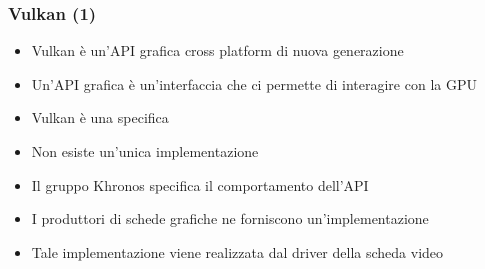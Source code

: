 \begin{frame}
\frametitle{Vulkan (1)}

\begin{itemize}
\item Vulkan è un'API grafica cross platform di nuova generazione
\item Un'API grafica è un'interfaccia che ci permette di interagire con la GPU
\item Vulkan è una specifica
\item Non esiste un'unica implementazione
\item Il gruppo Khronos specifica il comportamento dell'API
\item I produttori di schede grafiche ne forniscono un'implementazione
\item Tale implementazione viene realizzata dal driver della scheda video
\end{itemize}

\end{frame}
